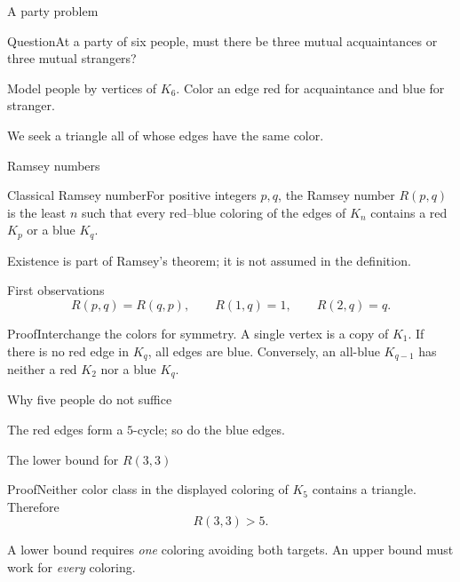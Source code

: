 \documentclass[aspectratio=169,11pt]{beamer}
\newcommand{\Def}[2]{\begin{block}{#1}#2\end{block}}
\renewcommand{\Proof}[1]{\begin{block}{Proof}\normalsize #1\end{block}}
\newcommand{\Question}[1]{\begin{block}{Question}#1\end{block}}
\newcommand{\gap}{\par\medskip}
\begin{document}
\begin{frame}{A party problem}
\large
\Question{At a party of six people, must there be three mutual acquaintances or three mutual strangers?}
\gap Model people by vertices of $K_6$. Color an edge red for acquaintance and blue for stranger.
\gap We seek a triangle all of whose edges have the same color.
\end{frame}
\begin{frame}{Ramsey numbers}
\large
\Def{Classical Ramsey number}{For positive integers $p,q$, the Ramsey number $R(p,q)$ is the least $n$ such that every red--blue coloring of the edges of $K_n$ contains a red $K_p$ or a blue $K_q$.}
\gap Existence is part of Ramsey's theorem; it is not assumed in the definition.
\end{frame}
\begin{frame}{First observations}
\large
\[R(p,q)=R(q,p),\qquad R(1,q)=1,\qquad R(2,q)=q.\]
\Proof{Interchange the colors for symmetry. A single vertex is a copy of $K_1$. If there is no red edge in $K_q$, all edges are blue. Conversely, an all-blue $K_{q-1}$ has neither a red $K_2$ nor a blue $K_q$.}
\end{frame}
\begin{frame}{Why five people do not suffice}
\large
\begin{center}\end{center}
\begin{center}The red edges form a $5$-cycle; so do the blue edges.\end{center}
\end{frame}
\begin{frame}{The lower bound for $R(3,3)$}
\large
\Proof{Neither color class in the displayed coloring of $K_5$ contains a triangle. Therefore
\[R(3,3)>5.\]}
\gap A lower bound requires \emph{one} coloring avoiding both targets. An upper bound must work for \emph{every} coloring.
\end{frame}
\end{document}
